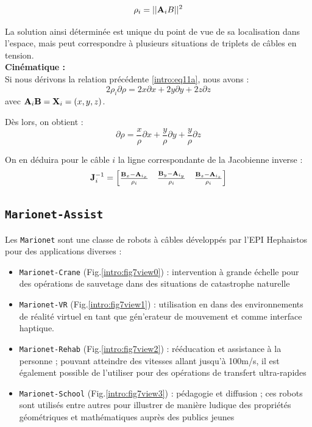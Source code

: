 \begin{equation}
\rho_i = ||{\bf A}_iB||^2
\label{intro:eq11a}
\end{equation}

La solution ainsi d\'etermin\'ee est unique du point de vue de sa localisation 
dans l'espace, mais peut correspondre \`a plusieurs situations de triplets de 
c\^ables en tension.\\

{\bf Cin\'ematique :}\\

Si nous d\'erivons la relation pr\'ec\'edente \ref{intro:eq11a}, nous avons :
\begin{equation}
2 \rho_i \partial \rho = 2 x \partial x + 2 y \partial y + 2 z \partial z
\label{intro:eq11a2}
\end{equation}
avec ${\bf A}_i{\bf B} = {\bf X}_i = (x, y, z)$.

D\`es lors, on obtient :
\begin{equation}
\partial \rho = \frac x \rho \partial x + \frac y \rho \partial y + \frac y 
\rho \partial z
\label{intro:eq11a3}
\end{equation}

On en d\'eduira pour le c\^able $i$ la ligne correspondante de la 
Jacobienne inverse :
\begin{equation}
{\bf J}^{-1}_i = 
\begin{bmatrix}
\frac {{\bf B}_x - {\bf A}_{i_x}} {\rho_i} & \frac {{\bf B}_y - {\bf A}_{i_y}} 
{\rho_i} & \frac {{\bf B}_z - {\bf A}_{i_z}} {\rho_i} 
\end{bmatrix}
\label{intro:eq11a4}
\end{equation}



\subsection{{\tt Marionet-Assist}} \label{chap0-2-2}

Les {\tt Marionet} sont une classe de robots à câbles développés par l'EPI 
Hephaistos pour des applications diverses \cite{merlet2010marionet} :
\begin{itemize}
 \item {\tt Marionet-Crane} (Fig.\ref{intro:fig7view0}) : intervention à grande 
échelle pour des opé\-rations de sauvetage dans des situations de catastrophe 
naturelle
 \item {\tt Marionet-VR} (Fig.\ref{intro:fig7view1}) : utilisation en dans des 
environnements de r\'ealit\'e virtuel en tant que g\'en'erateur de mouvement et 
comme interface haptique. 
 \item {\tt Marionet-Rehab} (Fig.\ref{intro:fig7view2}) : rééducation et 
assistance à la personne ; pouvant atteindre des vitesses allant jusqu'à 
100m/s, 
il est également possible de l'utiliser pour des opérations de transfert 
ultra-rapides
 \item {\tt Marionet-School} (Fig.\ref{intro:fig7view3}) : pédagogie et 
diffusion ; ces robots sont utilisés entre autres pour illustrer de manière 
ludique des propriétés géométriques et mathématiques auprès des publics jeunes
\end{itemize}

